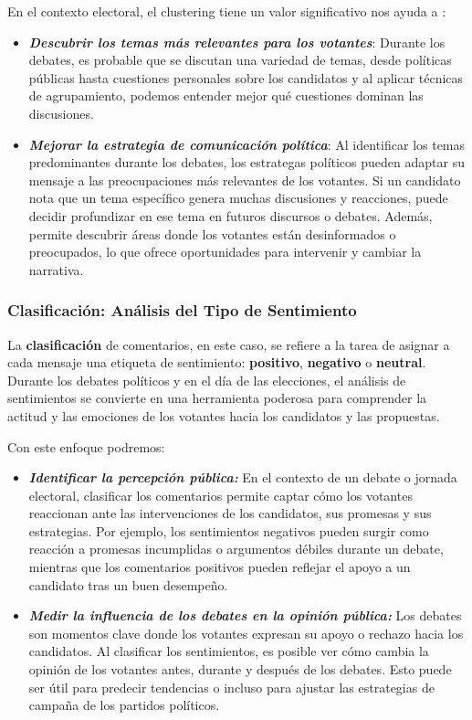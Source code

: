 \documentclass[10pt, a4paper]{article}
\begin{document}
	En el contexto electoral, el clustering tiene un valor significativo nos ayuda a :
	
	\begin{itemize}
		\item \textbf{\textit{Descubrir los temas más relevantes para los votantes}}: Durante los debates, es probable que se discutan una variedad de temas, desde políticas públicas hasta cuestiones personales sobre los candidatos y al aplicar técnicas de agrupamiento, podemos entender mejor qué cuestiones dominan las discusiones.
		\item \textbf{\textit{Mejorar la estrategia de comunicación política}}: Al identificar los temas predominantes durante los debates, los estrategas políticos pueden adaptar su mensaje a las preocupaciones más relevantes de los votantes. Si un candidato nota que un tema específico genera muchas discusiones y reacciones, puede decidir profundizar en ese tema en futuros discursos o debates. Además, permite descubrir áreas donde los votantes están desinformados o preocupados, lo que ofrece oportunidades para intervenir y cambiar la narrativa.
	\end{itemize}
	
	\subsubsection{Clasificación: Análisis del Tipo de Sentimiento}
	La \textbf{clasificación} de comentarios, en este caso, se refiere a la tarea de asignar a cada mensaje una etiqueta de sentimiento: \textbf{positivo}, \textbf{negativo} o \textbf{neutral}. Durante los debates políticos y en el día de las elecciones, el análisis de sentimientos se convierte en una herramienta poderosa para comprender la actitud y las emociones de los votantes hacia los candidatos y las propuestas.
	
	Con este enfoque podremos:
	\begin{itemize}
		\item \textbf{\textit{Identificar la percepción pública:}} En el contexto de un debate o jornada electoral, clasificar los comentarios permite captar cómo los votantes reaccionan ante las intervenciones de los candidatos, sus promesas y sus estrategias. Por ejemplo, los sentimientos negativos pueden surgir como reacción a promesas incumplidas o argumentos débiles durante un debate, mientras que los comentarios positivos pueden reflejar el apoyo a un candidato tras un buen desempeño.
		\item \textbf{\textit{Medir la influencia de los debates en la opinión pública:}} Los debates son momentos clave donde los votantes expresan su apoyo o rechazo hacia los candidatos. Al clasificar los sentimientos, es posible ver cómo cambia la opinión de los votantes antes, durante y después de los debates. Esto puede ser útil para predecir tendencias o incluso para ajustar las estrategias de campaña de los partidos políticos.
	\end{itemize}
	
\end{document}
